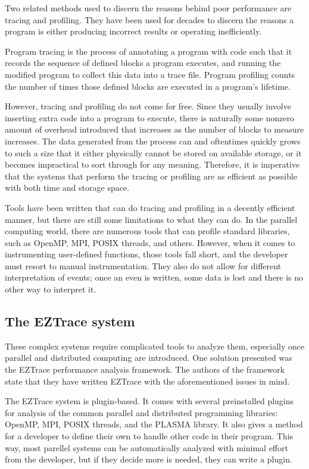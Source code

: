 \documentclass[12pt]{article}
\begin{document}
Two related methods used to discern the reasons behind poor performance are tracing and profiling. They have been used 
for decades to discern the reasons a program is either producing incorrect results or operating inefficiently.

Program tracing is the process of annotating a program with code such that it records the sequence of defined blocks a 
program executes, and running the modified program to collect this data into a trace file. Program profiling counts the 
number of times those defined blocks are executed in a program's lifetime. \cite{Ball1994, Larus1993} 

However, tracing and profiling do not come for free. Since they usually involve inserting extra code into a program to 
execute, there is naturally some nonzero amount of overhead introduced that increases as the number of blocks to measure 
increases. The data generated from the process can and oftentimes quickly grows to such a size that it either physically 
cannot be stored on available storage, or it becomes impractical to sort through for any meaning. Therefore, it is 
imperative that the systems that perform the tracing or profiling are as efficient as possible with both time and storage 
space. \cite{Ball1994, Larus1993, Mohror2012}

Tools have been written that can do tracing and profiling in a decently efficient manner, but there are still some limitations 
to what they can do. In the parallel computing world, there are numerous tools that can profile standard libraries, such as 
OpenMP, MPI, POSIX threads, and others. However, when it comes to instrumenting user-defined functions, those tools fall 
short, and the developer must resort to manual instrumentation. They also do not allow for different interpretation of 
events; once an even is written, some data is lost and there is no other way to interpret it. \cite{Trahay2011} 

\subsection{The EZTrace system}

These complex systems require complicated tools to analyze them, especially once parallel and distributed computing are 
introduced. One solution presented was the EZTrace performance analysis framework. The authors of the framework state 
that they have written EZTrace with the aforementioned issues in mind. \cite{Trahay2011}

The EZTrace system is plugin-based. It comes with several preinstalled plugins for analysis of the common parallel and 
distributed programming libraries: OpenMP, MPI, POSIX threads, and the PLASMA library. It also gives a method for a 
developer to define their own to handle other code in their program. This way, most parellel systems can be automatically 
analyzed with minimal effort from the developer, but if they decide more is needed, they can write a plugin. \cite{Trahay2011}
\end{document}
